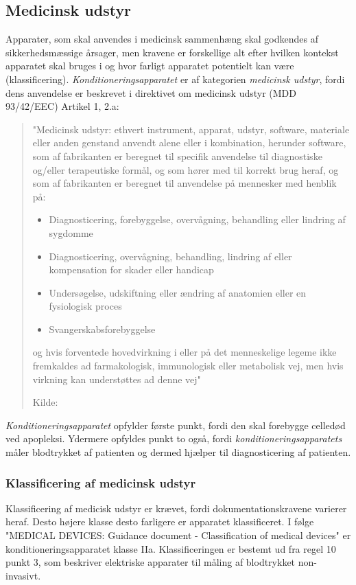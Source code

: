 \subsection{Medicinsk udstyr}
Apparater, som skal anvendes i medicinsk sammenhæng skal godkendes af sikkerhedsmæssige årsager, men kravene er forskellige alt efter hvilken kontekst apparatet skal bruges i og hvor farligt apparatet potentielt kan være (klassificering). \textit{Konditioneringsapparatet} er af kategorien \textit{medicinsk udstyr}, fordi dens anvendelse er beskrevet i direktivet om medicinsk udstyr (MDD 93/42/EEC) Artikel 1, 2.a:

\begin{quote}
	"Medicinsk udstyr: ethvert instrument, apparat, udstyr, software,
	materiale eller anden genstand anvendt alene eller i kombination,
	herunder software, som af fabrikanten er beregnet til specifik anvendelse
	til diagnostiske og/eller terapeutiske formål, og som hører med
	til korrekt brug heraf, og som af fabrikanten er beregnet til anvendelse
	på mennesker med henblik på:
	\begin{itemize}
		\item Diagnosticering, forebyggelse, overvågning, behandling eller
		lindring af sygdomme
		\item Diagnosticering, overvågning, behandling, lindring af eller
		kompensation for skader eller handicap
		\item Undersøgelse, udskiftning eller ændring af anatomien eller en
		fysiologisk proces
		\item Svangerskabsforebyggelse
	\end{itemize}
	
	og hvis forventede hovedvirkning i eller på det menneskelige
	legeme ikke fremkaldes ad farmakologisk, immunologisk eller metabolisk
	vej, men hvis virkning kan understøttes ad denne vej"
	
	Kilde: \cite{RefWorks:42}
\end{quote}

\textit{Konditioneringsapparatet} opfylder første punkt, fordi den skal forebygge celledød ved apopleksi. Ydermere opfyldes punkt to også, fordi \textit{konditioneringsapparatets} måler blodtrykket af patienten og dermed hjælper til diagnosticering af patienten.

\subsubsection{Klassificering af medicinsk udstyr}
Klassificering af medicisk udstyr er krævet, fordi dokumentationskravene varierer heraf. Desto højere klasse desto farligere er apparatet klassificeret. I følge "MEDICAL DEVICES: Guidance document - Classification of medical devices" er konditioneringsapparatet klasse IIa. Klassificeringen er bestemt ud fra regel 10 punkt 3, som beskriver elektriske apparater til måling af blodtrykket non-invasivt.

